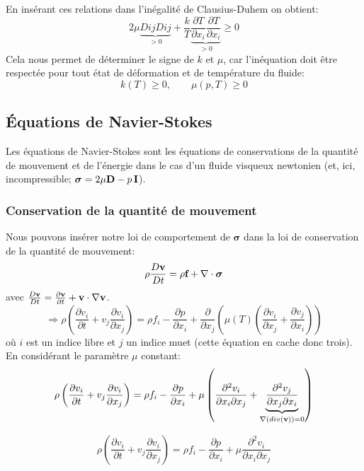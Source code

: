 En insérant ces relations dans l'inégalité de Clausius-Duhem on obtient:
$$2\mu\underbrace{DijDij}_{>0}+\frac{k}{T}\underbrace{\frac{\partial T}{\partial x_i}\frac{\partial T}{\partial x_i}}_{>0}\geq 0$$
Cela nous permet de déterminer le signe de $k$ et $\mu$, car l'inéquation doit être respectée pour tout état de déformation et de température du fluide:
$$\boxed{k(T)\geq 0, \qquad \mu(p,T)\geq 0}$$

\subsection{\'Equations de Navier-Stokes}
Les équations de Navier-Stokes sont les équations de conservations de la quantité de mouvement et de l'énergie dans le cas d'un fluide visqueux newtonien (et, ici, incompressible; $\boldsymbol{\sigma}=2\mu\textbf{D}-p\,\textbf{I}$).
\subsubsection*{Conservation de la quantité de mouvement}
Nous pouvons insérer notre loi de comportement de $\boldsymbol{\sigma}$ dans la loi de conservation de la quantité de mouvement:
$$\rho\frac{D\textbf{v}}{Dt}=\rho\textbf{f}+\nabla\cdot\boldsymbol{\sigma}$$
avec $\frac{D\textbf{v}}{Dt}=\frac{\partial\textbf{v}}{\partial t}+\textbf{v}\cdot\nabla\textbf{v}$.
$$\Rightarrow\rho\left(\frac{\partial v_i}{\partial t}+v_j\frac{\partial v_i}{\partial x_j}\right)=\rho f_i-\frac{\partial p}{\partial x_i}+\frac{\partial}{\partial x_j}\left(\mu(T)\left(\frac{\partial v_i}{\partial x_j}+\frac{\partial v_j}{\partial x_i}\right)\right) $$ où $i$ est un indice libre et $j$ un indice muet (cette équation en cache donc trois). En considérant le paramètre $\mu$ constant:
$$\rho\left(\frac{\partial v_i}{\partial t}+v_j\frac{\partial v_i}{\partial x_j}\right)=\rho f_i-\frac{\partial p}{\partial x_i}+\mu\left(\frac{\partial^2v_i}{\partial x_i\partial x_j}+\underbrace{\frac{\partial^2 v_j}{\partial x_j\partial x_i}}_{\nabla(div(\textbf{v}))=0}\right) $$

$$\boxed{\rho\left(\frac{\partial v_i}{\partial t}+v_j\frac{\partial v_i}{\partial x_j}\right)=\rho f_i-\frac{\partial p}{\partial x_i}+\mu\frac{\partial^2v_i}{\partial x_i\partial x_j}} $$

